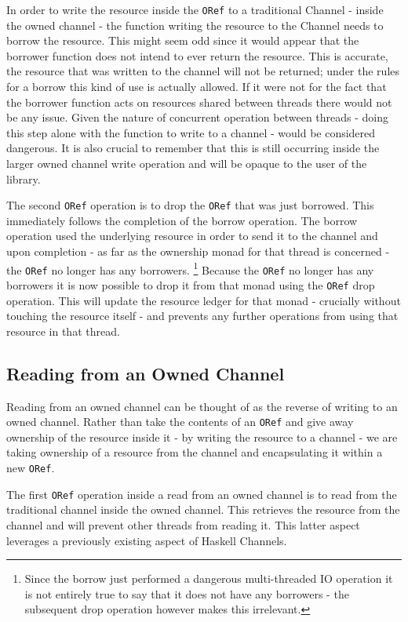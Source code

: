 \documentclass[onehalf,11pt]{beavtex}
\begin{document}
In order to write the resource inside the \texttt{ORef} to a traditional Channel
- inside the owned channel - the function writing the resource to the
Channel needs to borrow the resource.
This might seem odd since it would appear that the borrower function does not
intend to ever return the resource.  This is accurate, the resource that was
written to the channel will not be returned; under the rules for a
borrow this kind of use is actually allowed.  If it were not for the fact that
the borrower function acts on resources shared between threads there would not be
any issue.  Given the nature of concurrent operation between threads - doing
this step alone with the function to write to a channel - would be considered
dangerous.  It is also crucial to remember that this is still occurring inside
the larger owned channel write operation and will be opaque to the user
of the library.

The second \texttt{ORef} operation is to drop the \texttt{ORef} that was just
borrowed. This immediately follows the completion of the borrow operation. The
borrow operation used the underlying resource in order to send it to the channel
and upon completion - as far as the ownership monad for that thread is
concerned - the \texttt{ORef} no longer has any borrowers.
\footnote{Since the borrow just performed a dangerous multi-threaded IO operation
  it is not entirely true to say that it does not have any borrowers - the
  subsequent drop operation however makes this irrelevant.}
Because the \texttt{ORef} no longer has any borrowers it is now possible to
drop it from that monad using the \texttt{ORef} drop operation.  This will
update the resource ledger for that monad - crucially without touching the
resource itself - and prevents any further operations from using that resource
in that thread.

\subsection{Reading from an Owned Channel}

Reading from an owned channel can be thought of as the reverse of
writing to an owned channel.  Rather than take the contents of an
\texttt{ORef} and give away ownership of the resource inside it - by writing the
resource to a channel - we are taking ownership of a resource from the channel
and encapsulating it within a new \texttt{ORef}.

The first \texttt{ORef} operation inside a read from an owned channel
is to read from the traditional channel inside the owned channel. This
retrieves the resource from the channel and will prevent other threads from
reading it. This latter aspect leverages a previously existing aspect of
Haskell Channels. %
\end{document}
